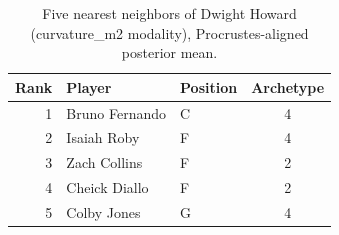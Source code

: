 \begin{table}[htbp]
  \centering\small
  \begin{tabular}{rllc}
    \toprule
    Rank & Player & Position & Archetype \\
    \midrule
    1 & Bruno Fernando & C & 4 \\
    2 & Isaiah Roby & F & 4 \\
    3 & Zach Collins & F & 2 \\
    4 & Cheick Diallo & F & 2 \\
    5 & Colby Jones & G & 4 \\
    \bottomrule
  \end{tabular}
  \caption{Five nearest neighbors of Dwight Howard (curvature_m2 modality), Procrustes-aligned posterior mean.}
  \label{tab:Dwight_Howard_neighbors_curvature_m2}
\end{table}

